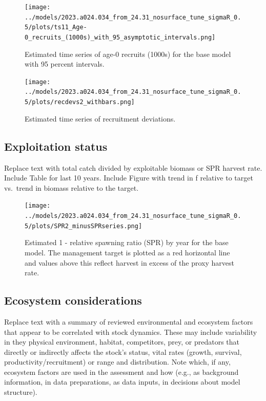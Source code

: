 \documentclass[11pt,
  english,
  letterpaper,
]{article}
\begin{document}


\begin{figure}
\centering
\texttt{[image: ../models/2023.a024.034\_from\_24.31\_nosurface\_tune\_sigmaR\_0.5/plots/ts11\_Age-0\_recruits\_(1000s)\_with\_95\_asymptotic\_intervals.png]}
\caption{Estimated time series of age-0 recruits (1000s) for the base model with 95 percent intervals.\label{fig:es-recruits}}
\end{figure}

\begin{figure}
\centering
\texttt{[image: ../models/2023.a024.034\_from\_24.31\_nosurface\_tune\_sigmaR\_0.5/plots/recdevs2\_withbars.png]}
\caption{Estimated time series of recruitment deviations.\label{fig:es-rec-devs}}
\end{figure}

\clearpage

\hypertarget{exploitation-status}{%
\subsection*{Exploitation status}\label{exploitation-status}}

Replace text with total catch divided by exploitable biomass or SPR harvest rate. Include Table for last 10 years. Include Figure with trend in f relative to target vs.~trend in biomass relative to the target.



\begin{figure}
\centering
\texttt{[image: ../models/2023.a024.034\_from\_24.31\_nosurface\_tune\_sigmaR\_0.5/plots/SPR2\_minusSPRseries.png]}
\caption{Estimated 1 - relative spawning ratio (SPR) by year for the base model. The management target is plotted as a red horizontal line and values above this reflect harvest in excess of the proxy harvest rate.\label{fig:es-1-spr}}
\end{figure}

\clearpage

\hypertarget{ecosystem-considerations}{%
\subsection*{Ecosystem considerations}\label{ecosystem-considerations}}

Replace text with a summary of reviewed environmental and ecosystem factors that appear to be correlated with stock dynamics. These may include variability in they physical environment, habitat, competitors, prey, or predators that directly or indirectly affects the stock's status, vital rates (growth, survival, productivity/recruitment) or range and distribution. Note which, if any, ecosystem factors are used in the assessment and how (e.g., as background information, in data preparations, as data inputs, in decisions about model structure).
\end{document}
